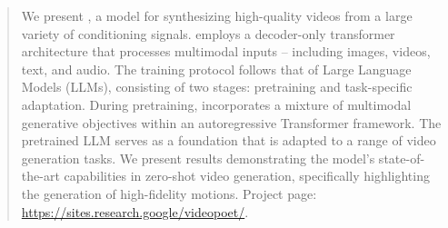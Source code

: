 \begin{abstract}
We present \modelname{}, a model for synthesizing high-quality videos from a large variety of conditioning signals.
\modelname{} employs a decoder-only transformer architecture that processes multimodal inputs -- including images, videos, text, and audio.
The training protocol follows that of Large Language Models (LLMs), consisting of two stages: pretraining and task-specific adaptation. During pretraining, \modelname{} incorporates a mixture of multimodal generative objectives within an autoregressive Transformer framework.
The pretrained LLM serves as a foundation that is adapted to a range of video generation tasks.
We present results demonstrating the model's state-of-the-art capabilities in zero-shot video generation, specifically highlighting the generation of high-fidelity motions. Project page: \url{https://sites.research.google/videopoet/}.
\end{abstract}

